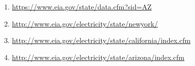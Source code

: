 \documentclass[12pt]{article}
\begin{document}
\begin{enumerate}
	\item \href{https://www.eia.gov/state/data.cfm?sid=AZ}{https://www.eia.gov/state/data.cfm?sid=AZ}\par

	\item \href{http://www.eia.gov/electricity/state/newyork/}{http://www.eia.gov/electricity/state/newyork/}\par

	\item \href{http://www.eia.gov/electricity/state/california/index.cfm}{http://www.eia.gov/electricity/state/california/index.cfm}\par

	\item \href{http://www.eia.gov/electricity/state/arizona/index.cfm}{http://www.eia.gov/electricity/state/arizona/index.cfm}
\end{enumerate}\par


\vspace{\baselineskip}
\setlength{\parskip}{6.96pt}

\vspace{\baselineskip}

\vspace{\baselineskip}

\printbibliography
\end{document}
